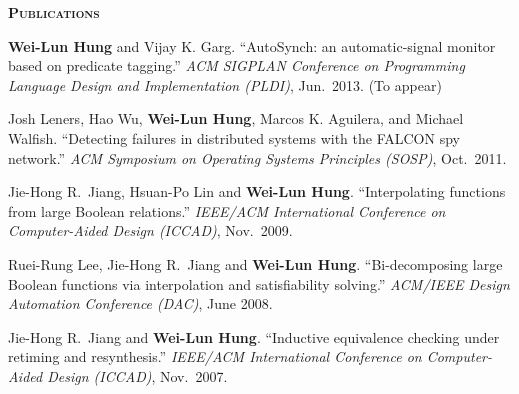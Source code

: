 \documentclass[11pt, letterpaper]{article}
\newcommand{\myscitem}[1]{\vspace{0.5\baselineskip} {\Large \textbf{\textsc{#1}} \reallynopagebreak}}
\newcommand{\myname}[1]{{\bf #1}}
\newenvironment{myexp}{
  \begin{list}{}{
      \setlength{\itemindent}{-0.15in}
      \setlength{\leftmargin}{0.3in}
      \addtolength{\topsep}{-0.1in}
    }
}{\end{list}}
\newenvironment{myenumerate}{
  \begin{list}{[\arabic{enumi}]}{
      \usecounter{enumi}
      \setlength{\itemindent}{0in}
      \setlength{\leftmargin}{0.3in}
      \addtolength{\topsep}{-0.1in}
    }
}{\end{list}}
\newenvironment{mybullet}{
  \begin{list}{\labelitemi}{
      \setlength{\itemindent}{0in}
      \setlength{\leftmargin}{0.15in}
      \setlength{\topsep}{0.02in}
      \setlength{\partopsep}{0pt}
    }
}{\end{list}}
\begin{document}
\begin{myexp}
\end{myexp}

\myscitem{Publications}

\begin{myenumerate}
    \item \myname{Wei-Lun Hung} and Vijay K. Garg. ``AutoSynch: an
        automatic-signal monitor based on predicate tagging.'' {\it ACM SIGPLAN
        Conference on Programming Language Design and Implementation (PLDI)},
        Jun.~2013. (To appear)
    \item Josh Leners, Hao Wu, \myname{Wei-Lun Hung}, Marcos K. Aguilera, and 
        Michael Walfish. ``Detecting failures in distributed systems with the 
        FALCON spy network.'' {\it ACM Symposium on Operating Systems 
        Principles (SOSP)}, Oct.~2011.
    \item Jie-Hong R.~Jiang, Hsuan-Po Lin and  \myname{Wei-Lun Hung}.
        ``Interpolating functions from large Boolean relations.'' {\it  
        IEEE/ACM International Conference on Computer-Aided Design (ICCAD)},  
        Nov.~2009.
    \item Ruei-Rung Lee, Jie-Hong R.~Jiang and \myname{Wei-Lun Hung}. 
        ``Bi-decomposing large Boolean functions via interpolation and 
        satisfiability solving.'' {\it ACM/IEEE Design Automation Conference 
        (DAC)}, June 2008. %
    \item Jie-Hong R.~Jiang and \myname{Wei-Lun Hung}. ``Inductive equivalence 
        checking under retiming and resynthesis.'' {\it IEEE/ACM International 
        Conference on Computer-Aided Design (ICCAD)}, Nov.~2007.
\end{myenumerate}
\end{document}
